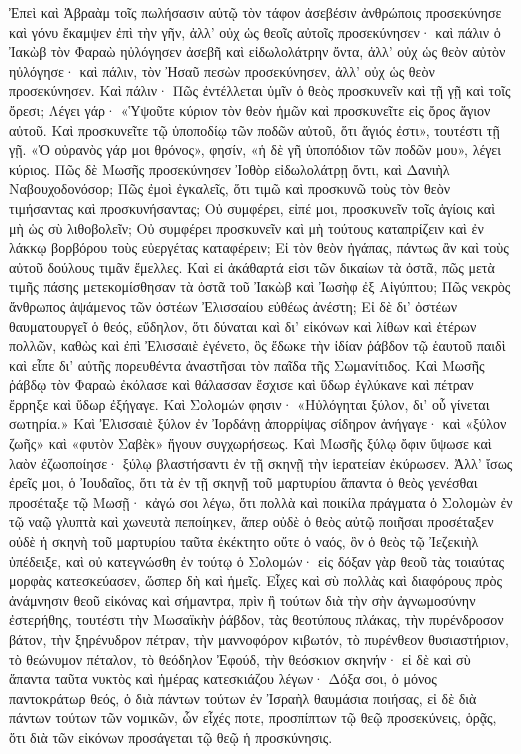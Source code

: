 \documentclass[10pt]{book}
\newcommand{\switchGreek}[1][]{\selectlanguage{polutonikogreek} \switchcolumn*[#1]}
\begin{document}
\begin{paracol}{2}
\switchGreek

Ἐπεὶ καὶ Ἀβραὰμ τοῖς πωλήσασιν αὐτῷ τὸν τάφον ἀσεβέσιν ἀνθρώποις προσεκύνησε
καὶ γόνυ ἔκαμψεν ἐπὶ τὴν γῆν, ἀλλ’ οὐχ ὡς θεοῖς αὐτοῖς προσεκύνησεν· καὶ πάλιν
ὁ Ἰακὼβ τὸν Φαραὼ ηὐλόγησεν ἀσεβῆ καὶ εἰδωλολάτρην ὄντα, ἀλλ’ οὐχ ὡς θεὸν
αὐτὸν ηὐλόγησε· καὶ πάλιν, τὸν Ἠσαῦ πεσὼν προσεκύνησεν, ἀλλ’ οὐχ ὡς θεὸν
προσεκύνησεν. Καὶ πάλιν· Πῶς ἐντέλλεται ὑμῖν ὁ θεὸς προσκυνεῖν καὶ τῇ γῇ καὶ
τοῖς ὄρεσι; Λέγει γάρ· «Ὑψοῦτε κύριον τὸν θεὸν ἡμῶν καὶ προσκυνεῖτε εἰς ὄρος
ἅγιον αὐτοῦ. Καὶ προσκυνεῖτε τῷ ὑποποδίῳ τῶν ποδῶν αὐτοῦ, ὅτι ἅγιός ἐστι»,
τουτέστι τῇ γῇ. «Ὁ οὐρανὸς γάρ μοι θρόνος», φησίν, «ἡ δὲ γῆ ὑποπόδιον τῶν
ποδῶν μου», λέγει κύριος. Πῶς δὲ Μωσῆς προσεκύνησεν Ἰοθὸρ εἰδωλολάτρῃ ὄντι,
καὶ Δανιὴλ Ναβουχοδονόσορ; Πῶς ἐμοὶ ἐγκαλεῖς, ὅτι τιμῶ καὶ προσκυνῶ τοὺς τὸν
θεὸν τιμήσαντας καὶ προσκυνήσαντας; Οὐ συμφέρει, εἰπέ μοι, προσκυνεῖν τοῖς
ἁγίοις καὶ μὴ ὡς σὺ λιθοβολεῖν; Οὐ συμφέρει προσκυνεῖν καὶ μὴ τούτους
καταπρίζειν καὶ ἐν λάκκῳ βορβόρου τοὺς εὐεργέτας καταφέρειν; Εἰ τὸν θεὸν
ἠγάπας, πάντως ἂν καὶ τοὺς αὐτοῦ δούλους τιμᾶν ἔμελλες. Καὶ εἰ ἀκάθαρτά εἰσι
τῶν δικαίων τὰ ὀστᾶ, πῶς μετὰ τιμῆς πάσης μετεκομίσθησαν τὰ ὀστᾶ τοῦ Ἰακὼβ καὶ
Ἰωσὴφ ἐξ Αἰγύπτου; Πῶς νεκρὸς ἄνθρωπος ἁψάμενος τῶν ὀστέων Ἐλισσαίου εὐθέως
ἀνέστη; Εἰ δὲ δι’ ὀστέων θαυματουργεῖ ὁ θεός, εὔδηλον, ὅτι δύναται καὶ δι’
εἰκόνων καὶ λίθων καὶ ἑτέρων πολλῶν, καθὼς καὶ ἐπὶ Ἐλισσαιὲ ἐγένετο, ὃς ἔδωκε
τὴν ἰδίαν ῥάβδον τῷ ἑαυτοῦ παιδὶ καὶ εἶπε δι’ αὐτῆς πορευθέντα ἀναστῆσαι τὸν
παῖδα τῆς Σωμανίτιδος. Καὶ Μωσῆς ῥάβδῳ τὸν Φαραὼ ἐκόλασε καὶ θάλασσαν ἔσχισε
καὶ ὕδωρ ἐγλύκανε καὶ πέτραν ἔρρηξε καὶ ὕδωρ ἐξήγαγε. Καὶ Σολομών φησιν·
«Ηὐλόγηται ξύλον, δι’ οὗ γίνεται σωτηρία.» Καὶ Ἐλισσαιὲ ξύλον ἐν Ἰορδάνῃ
ἀπορρίψας σίδηρον ἀνήγαγε· καὶ «ξύλον ζωῆς» καὶ «φυτὸν Σαβὲκ» ἤγουν
συγχωρήσεως. Καὶ Μωσῆς ξύλῳ ὄφιν ὕψωσε καὶ λαὸν ἐζωοποίησε· ξύλῳ βλαστήσαντι
ἐν τῇ σκηνῇ τὴν ἱερατείαν ἐκύρωσεν. Ἀλλ’ ἴσως ἐρεῖς μοι, ὁ Ἰουδαῖος, ὅτι τὰ ἐν
τῇ σκηνῇ τοῦ μαρτυρίου ἅπαντα ὁ θεὸς γενέσθαι προσέταξε τῷ Μωσῇ· κἀγώ σοι
λέγω, ὅτι πολλὰ καὶ ποικίλα πράγματα ὁ Σολομὼν ἐν τῷ ναῷ γλυπτὰ καὶ χωνευτὰ
πεποίηκεν, ἅπερ οὐδὲ ὁ θεὸς αὐτῷ ποιῆσαι προσέταξεν οὐδὲ ἡ σκηνὴ τοῦ μαρτυρίου
ταῦτα ἐκέκτητο οὔτε ὁ ναός, ὃν ὁ θεὸς τῷ Ἰεζεκιὴλ ὑπέδειξε, καὶ οὐ κατεγνώσθη
ἐν τούτῳ ὁ Σολομών· εἰς δόξαν γὰρ θεοῦ τὰς τοιαύτας μορφὰς κατεσκεύασεν, ὥσπερ
δὴ καὶ ἡμεῖς. Εἶχες καὶ σὺ πολλὰς καὶ διαφόρους πρὸς ἀνάμνησιν θεοῦ εἰκόνας
καὶ σήμαντρα, πρὶν ἢ τούτων διὰ τὴν σὴν ἀγνωμοσύνην ἐστερήθης, τουτέστι τὴν
Μωσαϊκὴν ῥάβδον, τὰς θεοτύπους πλάκας, τὴν πυρένδροσον βάτον, τὴν ξηρένυδρον
πέτραν, τὴν μαννοφόρον κιβωτόν, τὸ πυρένθεον θυσιαστήριον, τὸ θεώνυμον
πέταλον, τὸ θεόδηλον Ἐφούδ, τὴν θεόσκιον σκηνήν· εἰ δὲ καὶ σὺ ἅπαντα ταῦτα
νυκτὸς καὶ ἡμέρας κατεσκιάζου λέγων· Δόξα σοι, ὁ μόνος παντοκράτωρ θεός, ὁ διὰ
πάντων τούτων ἐν Ἰσραὴλ θαυμάσια ποιήσας, εἰ δὲ διὰ πάντων τούτων τῶν νομικῶν,
ὧν εἶχές ποτε, προσπίπτων τῷ θεῷ προσεκύνεις, ὁρᾷς, ὅτι διὰ τῶν εἰκόνων
προσάγεται τῷ θεῷ ἡ προσκύνησις.


\end{paracol}
\end{document}
